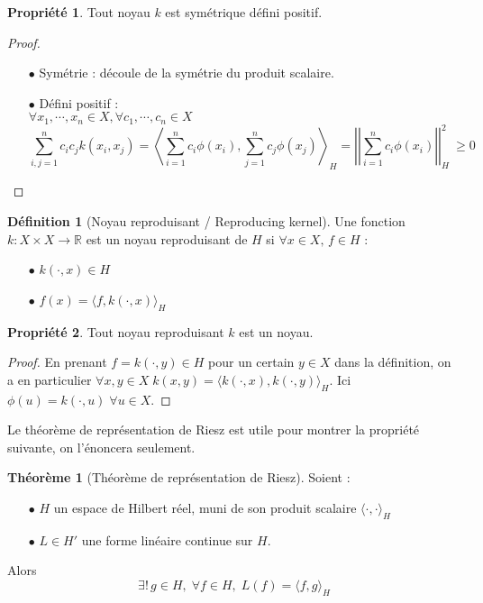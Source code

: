 \documentclass[a4paper, 11pt, french]{article}
\theoremstyle{definition}
\newtheorem{definition}{Définition}
\newtheorem{theorem}{Théorème}
\newtheorem{property}{Propriété}
\begin{document}
	\begin{property}
		Tout noyau $k$ est symétrique défini positif.
	\end{property}
	\begin{proof}
		\begin{itemize}
			\item[$\bullet$] Symétrie : découle de la symétrie du produit scalaire.			
			\item[$\bullet$] Défini positif : \\
			$\forall x_1, \cdots, x_n \in X, \forall c_1, \cdots, c_n \in X$
			\[\sum_{i,j=1}^{n} c_i c_j k(x_i, x_j) = \left\langle \sum_{i=1}^{n} c_i \phi(x_i), \sum_{j=1}^{n} c_j \phi(x_j) \right\rangle_H = \left|\left|\sum_{i=1}^{n} c_i \phi(x_i)\right|\right|_H^2\ \geq 0\]
		\end{itemize}
	\end{proof}

	\begin{definition}[Noyau reproduisant / Reproducing kernel]
		Une fonction $k : X \times X \to \mathbb{R}$ est un noyau reproduisant de $H$ si $\forall x \in X, \, f \in H$ :
		\begin{itemize}
			\item[$\bullet$] $k(\cdot, x) \in H$			
			\item[$\bullet$] $f(x) = \langle f, k(\cdot, x) \rangle_H$
		\end{itemize}
	\end{definition}

	\begin{property}
	\label{prop:reprotokernel}
		Tout noyau reproduisant $k$ est un noyau.
	\end{property}
	\begin{proof}
		En prenant $f = k(\cdot, y) \in H$ pour un certain $y \in X$ dans la définition, on a en particulier $\forall x, y \in X \; k(x,y) = \langle k(\cdot, x), k(\cdot, y) \rangle_H$. Ici $\phi(u) = k(\cdot, u) \; \forall u \in X$.
	\end{proof}

	Le théorème de représentation de Riesz est utile pour montrer la propriété suivante, on l'énoncera seulement.

	\begin{theorem}[Théorème de représentation de Riesz]
		Soient :
		\begin{itemize}
			\item[$\bullet$] $H$ un espace de Hilbert réel, muni de son produit scalaire $\langle \cdot, \cdot \rangle_H$
			\item[$\bullet$] $L \in H'$ une forme linéaire continue sur $H$.
		\end{itemize}
		Alors \[\exists ! \, g \in H, \; \forall f \in H, \; L(f) = \langle f, g \rangle_H\]
	\end{theorem}
\end{document}
